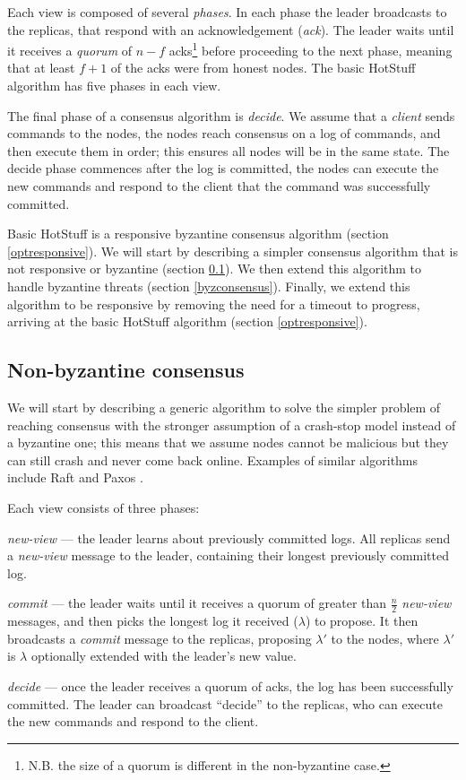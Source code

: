 Each view is composed of several \textit{phases}. In each phase the leader broadcasts to the replicas, that respond with an acknowledgement (\textit{ack}). The leader waits until it receives a \textit{quorum} of $n - f$ acks\footnote{N.B. the size of a quorum is different in the non-byzantine case.} before proceeding to the next phase, meaning that at least $f + 1$ of the acks were from honest nodes. The basic HotStuff algorithm has five phases in each view.

The final phase of a consensus algorithm is \textit{decide}. We assume that a \textit{client} sends commands to the nodes, the nodes reach consensus on a log of commands, and then execute them in order; this ensures all nodes will be in the same state. The decide phase commences after the log is committed, the nodes can execute the new commands and respond to the client that the command was successfully committed.

Basic HotStuff is a responsive byzantine consensus algorithm (section \ref{optresponsive}). We will start by describing a simpler consensus algorithm that is not responsive or byzantine (section \ref{nonbyzconsensus}). We then extend this algorithm to handle byzantine threats (section \ref{byzconsensus}). Finally, we extend this algorithm to be responsive by removing the need for a timeout to progress, arriving at the basic HotStuff algorithm (section \ref{optresponsive}).

\subsection{Non-byzantine consensus} \label{nonbyzconsensus}
We will start by describing a generic algorithm to solve the simpler problem of reaching consensus with the stronger assumption of a crash-stop model instead of a byzantine one; this means that we assume nodes cannot be malicious but they can still crash and never come back online. Examples of similar algorithms include Raft \cite{ongaroSearchUnderstandableConsensus2014} and Paxos \cite{lamportParttimeParliament1998, lamportPaxosMadeSimple2001}.

Each view consists of three phases:

\begin{description}
	\item \textit{new-view} --- the leader learns about previously committed logs. All replicas send a \textit{new-view} message to the leader, containing their longest previously committed log.
	\item \textit{commit} --- the leader waits until it receives a quorum of greater than $\frac{n}{2}$ \textit{new-view} messages, and then picks the longest log it received ($\lambda$) to propose. It then broadcasts a \textit{commit} message to the replicas, proposing $\lambda'$ to the nodes, where $\lambda'$ is $\lambda$ optionally extended with the leader's new value.
	\item \textit{decide} --- once the leader receives a quorum of acks, the log has been successfully committed. The leader can broadcast ``decide'' to the replicas, who can execute the new commands and respond to the client.
\end{description}

